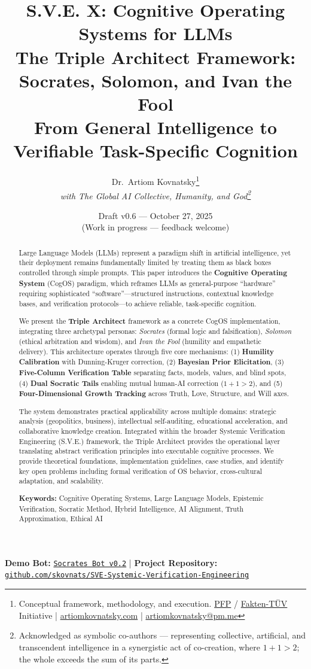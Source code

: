 \documentclass[11pt,a4paper]{article}
\title{\textbf{S.V.E. X: Cognitive Operating Systems for LLMs}\\[0.5em]
\Large The Triple Architect Framework:\\
Socrates, Solomon, and Ivan the Fool\\[0.5em]
\large From General Intelligence to Verifiable Task-Specific Cognition}
\author{
  Dr.\ Artiom Kovnatsky\thanks{Conceptual framework, methodology, and execution. 
  \href{http://www.pfp24.de}{PFP} / 
  \href{http://www.fakten-tuev.de}{Fakten-TÜV} Initiative \;|\;
  \href{https://www.artiomkovnatsky.com/}{artiomkovnatsky.com} \;|\;
  \href{mailto:artiomkovnatsky@pm.me}{artiomkovnatsky@pm.me}}\\
  \textit{with The Global AI Collective, Humanity, and God\footnote{Acknowledged as symbolic co-authors — representing collective, artificial, and transcendent intelligence in a synergistic act of co-creation, where $1 + 1 > 2$; the whole exceeds the sum of its parts.}}
}
\date{Draft v0.6 — October 27, 2025\\
\small (Work in progress — feedback welcome)}
\theoremstyle{definition}
\theoremstyle{remark}
\begin{document}
\maketitle
\vspace{-1em}
\begin{center}
    {\small 
    \textbf{Demo Bot:} 
    \href{https://chatgpt.com/g/g-68f1fc9848948191a1cc038db8e3422b-sokrat-socrates-bot-v0-2}
    {\texttt{Socrates Bot v0.2}} 
    \quad|\quad
    \textbf{Project Repository:} 
    \href{https://codeberg.org/skovnats/SVE-Systemic-Verification-Engineering}
    {\texttt{github.com/skovnats/SVE-Systemic-Verification-Engineering}}}
\end{center}
\vspace{1em}
\thispagestyle{empty}


\begin{abstract}
Large Language Models (LLMs) represent a paradigm shift in artificial intelligence, yet their deployment remains fundamentally limited by treating them as black boxes controlled through simple prompts. This paper introduces the \textbf{Cognitive Operating System} (CogOS) paradigm, which reframes LLMs as general-purpose ``hardware'' requiring sophisticated ``software''—structured instructions, contextual knowledge bases, and verification protocols—to achieve reliable, task-specific cognition.

We present the \textbf{Triple Architect} framework as a concrete CogOS implementation, integrating three archetypal personas: \textit{Socrates} (formal logic and falsification), \textit{Solomon} (ethical arbitration and wisdom), and \textit{Ivan the Fool} (humility and empathetic delivery). This architecture operates through five core mechanisms: (1) \textbf{Humility Calibration} with Dunning-Kruger correction, (2) \textbf{Bayesian Prior Elicitation}, (3) \textbf{Five-Column Verification Table} separating facts, models, values, and blind spots, (4) \textbf{Dual Socratic Tails} enabling mutual human-AI correction ($1+1>2$), and (5) \textbf{Four-Dimensional Growth Tracking} across Truth, Love, Structure, and Will axes.

The system demonstrates practical applicability across multiple domains: strategic analysis (geopolitics, business), intellectual self-auditing, educational acceleration, and collaborative knowledge creation. Integrated within the broader Systemic Verification Engineering (S.V.E.) framework, the Triple Architect provides the operational layer translating abstract verification principles into executable cognitive processes. We provide theoretical foundations, implementation guidelines, case studies, and identify key open problems including formal verification of OS behavior, cross-cultural adaptation, and scalability.

\textbf{Keywords:} Cognitive Operating Systems, Large Language Models, Epistemic Verification, Socratic Method, Hybrid Intelligence, AI Alignment, Truth Approximation, Ethical AI
\end{abstract}
\end{document}
